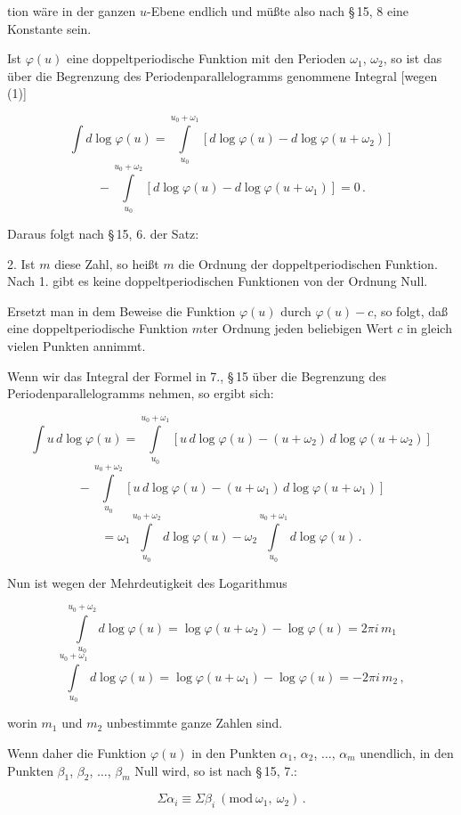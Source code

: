
tion wäre in der ganzen $u$-Ebene endlich und müßte also nach
§\,15, 8 eine Konstante sein.

Ist $\varphi(u)$ eine doppeltperiodische Funktion mit den Perioden
$\omega_1$, $\omega_2$, so ist das über die Begrenzung des Periodenparallelogramms
 genommene Integral [wegen (1)]

\[
\int d\log\varphi(u) = \int\limits_{u_0}^{u_0+\omega_1} [d\log\varphi(u) - d\log\varphi(u+\omega_2)]
\]
\[
{}-\int\limits_{u_0}^{u_0+\omega_2} [d\log\varphi(u) - d\log\varphi(u+\omega_1)] = 0\,.
\]

Daraus folgt nach §\,15, 6. der Satz:

2.  Ist $m$ diese Zahl, so heißt $m$ die Ordnung
der doppeltperiodischen Funktion. Nach 1. gibt es keine
doppeltperiodischen Funktionen von der Ordnung Null.

Ersetzt man in dem Beweise die Funktion $\varphi(u)$ durch $\varphi(u)-c$,
so folgt, daß eine doppeltperiodische Funktion $m$ter Ordnung
jeden beliebigen Wert $c$ in gleich vielen Punkten annimmt.

Wenn wir das Integral der Formel in 7., §\,15 über die Begrenzung
 des Periodenparallelogramms nehmen, so ergibt sich:

\[
\int u\, d\log\varphi(u) = \int\limits_{u_0}^{u_0+\omega_1} [u\,d\log\varphi(u) - (u+\omega_2)\,d\log\varphi(u+\omega_2)]
\]
\[
{}-\int\limits_{u_0}^{u_0+\omega_2} [u\,d\log\varphi(u) - (u+\omega_1)\,d\log\varphi(u+\omega_1)]
\]
\[
{}=\omega_1\int\limits_{u_0}^{u_0+\omega_2} d\log\varphi(u) - \omega_2\int\limits_{u_0}^{u_0+\omega_1} d\log\varphi(u)\,.
\]

Nun ist wegen der Mehrdeutigkeit des Logarithmus

\[
\int\limits_{u_0}^{u_0+\omega_2} d\log\varphi(u) = \log\varphi(u+\omega_2) - \log\varphi(u) = 2\pi i\, m_1
\]
\[
\int\limits_{u_0}^{u_0+\omega_1} d\log\varphi(u) = \log\varphi(u+\omega_1) - \log\varphi(u) = -2\pi i\, m_2\,,
\]

worin $m_1$ und $m_2$ unbestimmte ganze Zahlen sind.

Wenn daher die Funktion $\varphi(u)$ in den Punkten $\alpha_1$, $\alpha_2$, $\dots$, $\alpha_m$
unendlich, in den Punkten $\beta_1$, $\beta_2$, $\dots$, $\beta_m$ Null wird, so ist nach
§\,15, 7.:

\[ \Sigma\alpha_i \equiv \Sigma\beta_i \ (\mathrm{mod}\ \omega_1,\ \omega_2)\,. \]
